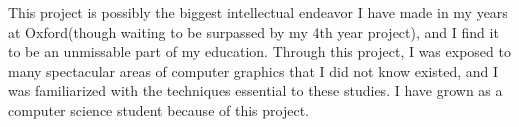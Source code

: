 This project is possibly the biggest intellectual endeavor I have made in my years at Oxford(though waiting to be surpassed by my 4th year project), and I find it to be an unmissable part of my education. Through this project, I was exposed to many spectacular areas of computer graphics that I did not know existed, and I was familiarized with the techniques essential to these studies. I have grown as a computer science student because of this project.